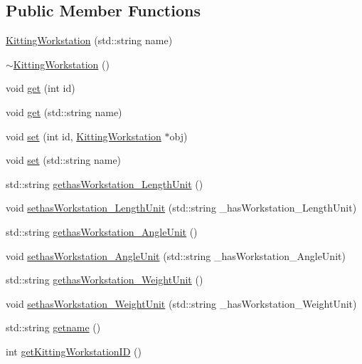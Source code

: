 \subsection*{Public Member Functions}
\begin{DoxyCompactItemize}
\item 
\hyperlink{class_kitting_workstation_a5a968e33d3a86c2853c95b025d8176c5}{KittingWorkstation} (std::string name)
\item 
\hyperlink{class_kitting_workstation_a1e14399aa00c025c34a38e39b0788e91}{$\sim$KittingWorkstation} ()
\item 
void \hyperlink{class_kitting_workstation_ad0604b57a69a9216e5b7cf7e6ed36430}{get} (int id)
\item 
void \hyperlink{class_kitting_workstation_a5f5afa0d30bf06607f8146b7ae891ca2}{get} (std::string name)
\item 
void \hyperlink{class_kitting_workstation_a3721594c895240c1281d45c16550af26}{set} (int id, \hyperlink{class_kitting_workstation}{KittingWorkstation} $\ast$obj)
\item 
void \hyperlink{class_kitting_workstation_ad4c1ef528b4000e6fea71dda5e30045a}{set} (std::string name)
\item 
std::string \hyperlink{class_kitting_workstation_a2103f41967858ea898ed5b99e8787f3f}{gethasWorkstation\_\-LengthUnit} ()
\item 
void \hyperlink{class_kitting_workstation_a4b2e062f0d632a30c98b4e0ae9f53989}{sethasWorkstation\_\-LengthUnit} (std::string \_\-hasWorkstation\_\-LengthUnit)
\item 
std::string \hyperlink{class_kitting_workstation_aa197ba46feef37e1441eb845d5ee6b60}{gethasWorkstation\_\-AngleUnit} ()
\item 
void \hyperlink{class_kitting_workstation_a8b71e166c9aed84f61a4373f319d10d4}{sethasWorkstation\_\-AngleUnit} (std::string \_\-hasWorkstation\_\-AngleUnit)
\item 
std::string \hyperlink{class_kitting_workstation_a4dfbd79b09b8a72115776f3e08396cd3}{gethasWorkstation\_\-WeightUnit} ()
\item 
void \hyperlink{class_kitting_workstation_a324d232e15534504757fff54c849df5e}{sethasWorkstation\_\-WeightUnit} (std::string \_\-hasWorkstation\_\-WeightUnit)
\item 
std::string \hyperlink{class_kitting_workstation_a8866f41855e3310f3e1548b9847a6443}{getname} ()
\item 
int \hyperlink{class_kitting_workstation_a1064090607141133d3fcaa26494c48ba}{getKittingWorkstationID} ()

\end{DoxyCompactItemize}
